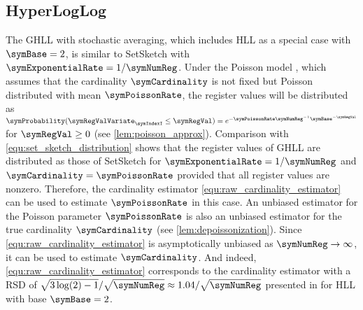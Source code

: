\documentclass[sigconf, nonacm]{acmart}
\newif\ifextended\extendedtrue
\begin{document}
\subsection{HyperLogLog}
\label{sec:comp_hll}
The \acf{GHLL} with stochastic averaging, which includes \ac{HLL} as a special case with $\symBase=2$, is similar to SetSketch with $\symExponentialRate=1/\symNumReg$. Under the Poisson model \cite{Flajolet2007, Ertl2017}, which assumes that the cardinality $\symCardinality$ is not fixed but Poisson distributed with mean $\symPoissonRate$, the register values will be distributed as $\symProbability(\symRegValVariate_\symIndexI\leq \symRegVal) = e^{-\symPoissonRate\symNumReg^{-1}\symBase^{-\symRegVal}}$ for $\symRegVal\geq 0$ \ifextended(see \cref{lem:poisson_approx})\else\cite{Ertl2021}\fi.
Comparison with \eqref{equ:set_sketch_distribution} shows that the register values of \ac{GHLL} are distributed as those of SetSketch for $\symExponentialRate=1/\symNumReg$ and $\symCardinality=\symPoissonRate$ provided that all register values are nonzero. Therefore, the cardinality estimator \eqref{equ:raw_cardinality_estimator} can be used to estimate $\symPoissonRate$ in this case. An unbiased estimator for the Poisson parameter $\symPoissonRate$ is also an unbiased estimator for the true cardinality $\symCardinality$ \ifextended(see \cref{lem:depoissonization})\else\cite{Ertl2021}\fi. Since \eqref{equ:raw_cardinality_estimator} is asymptotically unbiased as $\symNumReg\rightarrow \infty$, it can be used to estimate $\symCardinality$. And indeed, \eqref{equ:raw_cardinality_estimator} corresponds to the cardinality estimator with a \ac{RSD} of $\sqrt{3\log(2)-1}/\sqrt{\symNumReg} \approx 1.04/\sqrt{\symNumReg}$ presented in \cite{Flajolet2007} for \ac{HLL} with base $\symBase=2$. 
\end{document}
